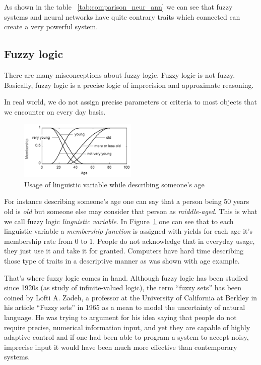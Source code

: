 As shown in the table ~\ref{tab:comparison_neur_ann} we can see that fuzzy systems and neural networks have quite contrary traits which connected can create a very powerful system.

\subsection{Fuzzy logic}
There are many misconceptions about fuzzy logic.
Fuzzy logic is not fuzzy.
Basically, fuzzy logic is a precise logic of imprecision and approximate reasoning.

In real world, we do not assign precise parameters or criteria to most objects that we encounter on every day basis.

\begin{figure}
	\captionsetup{width=18pc}
	\vspace*{-2em}
	\hspace*{1.5em}
	\includegraphics[width=0.5\textwidth]{images/old_graph.png}
	\caption{Usage of linguistic variable while describing someone's age~\cite{lecture_rome_university}}
	\label{fig:old_graph}
	\vspace*{-2em}
\end{figure}

For instance describing someone's age one can say that a person being 50 years old is \emph{old} but someone else may consider that person as \emph{middle-aged}.
This is what we call fuzzy logic \emph{linguistic variable}.
In Figure~\ref{fig:old_graph} one can see that to each linguistic variable a \emph{membership function} is assigned with yields for each age it's membership rate from 0 to 1.
People do not acknowledge that in everyday usage, they just use it and take it for granted.
Computers have hard time describing those type of traits in a descriptive manner as was shown with age example.

That's where fuzzy logic comes in hand.
Although fuzzy logic has been studied since 1920s (as study of infinite-valued logic), the term ``fuzzy sets'' has been coined by Lofti A. Zadeh, a professor at the University of California at Berkley in his article ``Fuzzy sets'' in 1965 \cite{fuzzy_sets_zadeh} as a mean to model the uncertainty
of natural language.
He was trying to argument for his idea saying that people do not require precise, numerical information input, and yet they are capable of highly adaptive control and if one had been able to program a system to accept noisy, imprecise input it would have been much more effective than contemporary systems.

